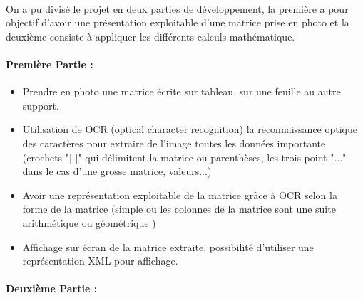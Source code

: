 \documentclass[a4paper,11pt]{article}
\begin{document}
\paragraph{}
\begin{doublespacing}
		On a pu divisé le projet en deux parties de développement, la première a pour objectif d'avoir une présentation exploitable d'une matrice prise en photo et la deuxième consiste à appliquer les différents calculs mathématique.
	
		\paragraph{Première Partie :}
	
		
		\begin{itemize}
		
		\item Prendre en photo une matrice écrite sur tableau, sur une feuille au autre support.
		\item Utilisation de OCR (optical character recognition) la reconnaissance optique des caractères pour extraire de l'image toutes les données importante (crochets "[ ]" qui délimitent la matrice ou parenthèses, les trois point "..." dans le cas d'une grosse matrice, valeurs...)
		
		\item Avoir une représentation exploitable de la matrice grâce à OCR selon la forme de la matrice (simple ou les colonnes de la matrice sont une suite arithmétique ou géométrique )
		\item Affichage sur écran de la matrice extraite, possibilité d'utiliser une représentation XML pour affichage.
		
		\end{itemize}
		
	\end{doublespacing}	
		
		\paragraph{Deuxième Partie :}
		
\end{document}

